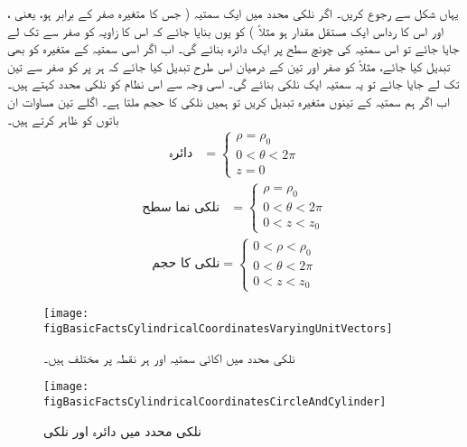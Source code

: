 یہاں شکل   سے رجوع کریں۔ اگر نلکی محدد میں ایک سمتیہ ( جس کا متغیرہ  صفر کے برابر ہو، یعنی  ، اور اس کا رداس   ایک مستقل مقدار ہو مثلاً ) کو یوں بنایا جائے کہ اس کا زاویہ  کو صفر سے   تک لے جایا جائے تو اس سمتیہ کی چونچ سطح  پر ایک دائرہ بنائے گی۔ اب اگر اسی سمتیہ کے متغیرہ  کو بھی تبدیل کیا جائے، مثلاً  کو صفر اور تین کے درمیان اس طرح تبدیل کیا جائے کہ ہر  پر  کو صفر سے تین تک لے جایا جائے تو یہ سمتیہ ایک نلکی بنائے گی۔ اسی وجہ سے اس نظام کو نلکی محدد کہتے ہیں۔ اب اگر ہم سمتیہ کے تینوں متغیرہ تبدیل کریں تو ہمیں نلکی کا حجم ملتا ہے۔ اگلے تین مساوات ان باتوں کو ظاہر کرتے ہیں۔
\begin{align}
 \text{دائرہ}&= \left\{ 
  \begin{array}{l}
    \rho=\rho_0\\
    0<\theta<2 \pi \\
    z=0
  \end{array} \right.
\end{align}
%
\begin{align}
 \text{نلکی نما سطح}&= \left\{ 
  \begin{array}{l}
    \rho=\rho_0\\
    0<\theta<2 \pi \\
  0<z<z_0
  \end{array} \right.
\end{align}
%
\begin{align}
 \text{نلکی کا حجم}= \left\{ 
  \begin{array}{l}
    0<\rho<\rho_0\\
    0<\theta<2 \pi \\
  0<z<z_0
  \end{array} \right.
\end{align}
%
\begin{figure}
\centering
\texttt{[image: figBasicFactsCylindricalCoordinatesVaryingUnitVectors]}
\caption{نلکی محدد میں اکائی سمتیہ  اور  ہر نقطہ پر مختلف ہیں۔}
\label{شکل_حقائق_نلکی_نظام_میں_اکائی_سمتیات_اٹل_نہیں}
\end{figure}
%
\begin{figure}
\centering
\texttt{[image: figBasicFactsCylindricalCoordinatesCircleAndCylinder]}
\caption{‫نلکی محدد میں دائرہ اور نلکی‬}
\label{شکل_حقائق_نلکی_نظام_میں_دائرہ_اور_نلکی}
\end{figure}

